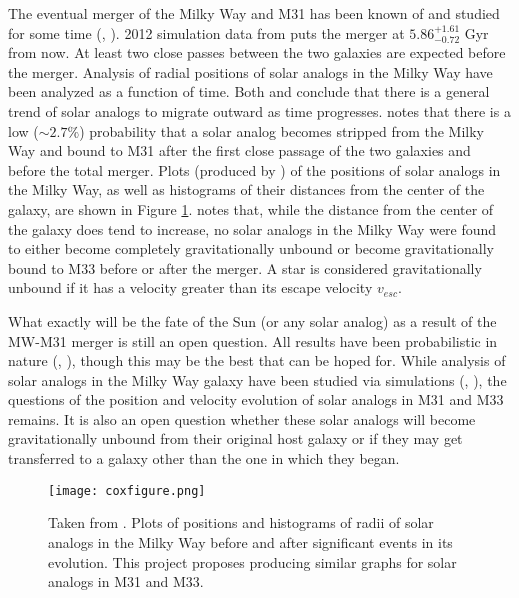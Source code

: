 \documentclass{aastex63}
\begin{document}
\indent The eventual merger of the Milky Way and M31 has been known of and studied for some time (\cite{dub06}, \cite{cox08}). 2012 simulation data from \cite{van12} puts the merger at $5.86^{+1.61}_{-0.72}$ Gyr from now. At least two close passes between the two galaxies are expected before the merger. Analysis of radial positions of solar analogs in the Milky Way have been analyzed as a function of time. Both \cite{van12} and \cite{cox08} conclude that there is a general trend of solar analogs to migrate outward as time progresses. \cite{cox08} notes that there is a low ($\sim 2.7 \%$) probability that a solar analog becomes stripped from the Milky Way and bound to M31 after the first close passage of the two galaxies and before the total merger. Plots (produced by \cite{cox08}) of the positions of solar analogs in the Milky Way, as well as histograms of their distances from the center of the galaxy, are shown in Figure \ref{coxfigure}. \cite{van12} notes that, while the distance from the center of the galaxy does tend to increase, no solar analogs in the Milky Way were found to either become completely gravitationally unbound or become gravitationally bound to M33 before or after the merger. A star is considered gravitationally unbound if it has a velocity greater than its escape velocity $v_{esc}$. 

What exactly will be the fate of the Sun (or any solar analog) as a result of the MW-M31 merger is still an open question. All results have been probabilistic in nature (\cite{cox08}, \cite{van12}), though this may be the best that can be hoped for. While analysis of solar analogs in the Milky Way galaxy have been studied via simulations (\cite{cox08}, \cite{van12}), the questions of the position and velocity evolution of solar analogs in M31 and M33 remains. It is also an open question whether these solar analogs will become gravitationally unbound from their original host galaxy or if they may get transferred to a galaxy other than the one in which they began.

\begin{figure}
    \centering
    \texttt{[image: coxfigure.png]}
    \caption{Taken from \cite{cox08}. Plots of positions and histograms of radii of solar analogs in the Milky Way before and after significant events in its evolution. This project proposes producing similar graphs for solar analogs in M31 and M33.}
    \label{coxfigure}
\end{figure}

\newpage
\end{document}
